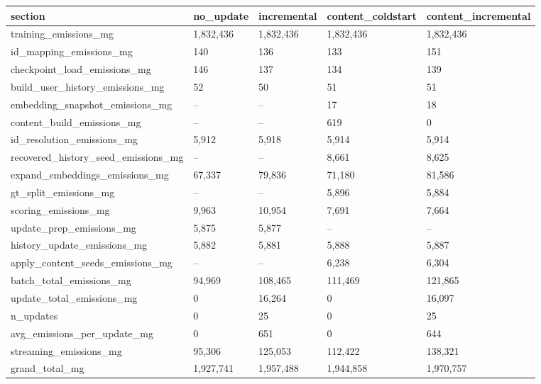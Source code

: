 \begin{tabular}{lllll}
\toprule
section & no_update & incremental & content_coldstart & content_incremental \\
\midrule
training_emissions_mg & 1,832,436 & 1,832,436 & 1,832,436 & 1,832,436 \\
id_mapping_emissions_mg & 140 & 136 & 133 & 151 \\
checkpoint_load_emissions_mg & 146 & 137 & 134 & 139 \\
build_user_history_emissions_mg & 52 & 50 & 51 & 51 \\
embedding_snapshot_emissions_mg & -- & -- & 17 & 18 \\
content_build_emissions_mg & -- & -- & 619 & 0 \\
id_resolution_emissions_mg & 5,912 & 5,918 & 5,914 & 5,914 \\
recovered_history_seed_emissions_mg & -- & -- & 8,661 & 8,625 \\
expand_embeddings_emissions_mg & 67,337 & 79,836 & 71,180 & 81,586 \\
gt_split_emissions_mg & -- & -- & 5,896 & 5,884 \\
scoring_emissions_mg & 9,963 & 10,954 & 7,691 & 7,664 \\
update_prep_emissions_mg & 5,875 & 5,877 & -- & -- \\
history_update_emissions_mg & 5,882 & 5,881 & 5,888 & 5,887 \\
apply_content_seeds_emissions_mg & -- & -- & 6,238 & 6,304 \\
batch_total_emissions_mg & 94,969 & 108,465 & 111,469 & 121,865 \\
update_total_emissions_mg & 0 & 16,264 & 0 & 16,097 \\
n_updates & 0 & 25 & 0 & 25 \\
avg_emissions_per_update_mg & 0 & 651 & 0 & 644 \\
streaming_emissions_mg & 95,306 & 125,053 & 112,422 & 138,321 \\
grand_total_mg & 1,927,741 & 1,957,488 & 1,944,858 & 1,970,757 \\
\bottomrule
\end{tabular}
